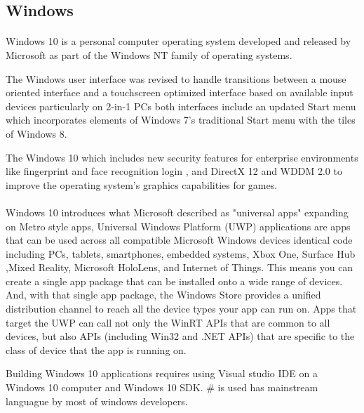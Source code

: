 \subsection{Windows}

\paragraph{}
Windows 10 is a personal computer operating system developed and released by Microsoft as part of the Windows NT family of operating systems.

The Windows user interface was revised to handle transitions between a mouse oriented interface and a touchscreen optimized interface based on available input devices particularly on 2-in-1 PCs
both interfaces include an updated Start menu which incorporates elements of Windows 7's traditional Start menu with the tiles of Windows 8.

The Windows 10 which includes new security features for enterprise environments like fingerprint and face recognition login , and DirectX 12 and WDDM 2.0 to improve the operating system's graphics capabilities for games.


\paragraph{}
Windows 10 introduces what Microsoft described as "universal apps" expanding on Metro style apps, Universal Windows Platform (UWP) applications  are apps that can be used across all compatible Microsoft Windows devices identical code including PCs, tablets, smartphones, embedded systems, Xbox One, Surface Hub ,Mixed Reality, Microsoft HoloLens, and Internet of Things.
This means you can create a single app package that can be installed onto a wide range of devices. And, with that single app package,
the Windows Store provides a unified distribution channel to reach all the device types your app can run on. Apps that target the UWP can call not only the WinRT APIs that are common to all devices, but also APIs (including Win32 and .NET APIs) that are specific to the class of device that the app is running on.

Building Windows 10 applications requires using Visual studio IDE on a Windows 10 computer and Windows 10 SDK. \# is used has mainstream languague by most of windows developers.
\paragraph{}


